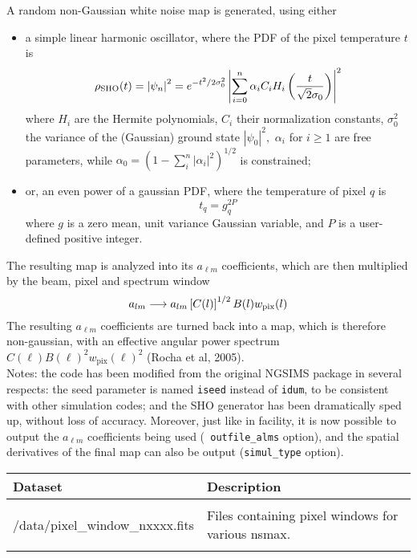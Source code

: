 \begin{codedescription}
{%
A random non-Gaussian white noise map is generated, using either
\begin{itemize}
%
\item a simple linear harmonic oscillator, where the PDF of the pixel
temperature $t$ is
	\begin{equation}
	\rho_{\rm SHO}(t) = \left| \psi_n\right|^2 = e^{-t^2/2\sigma_0^2} \left|\sum_{i=0}^{n} \alpha_i
C_i H_i \left(\frac{t}{\sqrt{2}\sigma_0}\right)\right|^2 \label{eq:nongauss_sho}
	\end{equation}
where $H_i$ are the Hermite polynomials, $C_i$ their normalization constants,
$\sigma_0^2$ the variance of the (Gaussian) ground state $\left|\psi_0\right|^2,$
$\alpha_i$ for $i\ge 1$ are free parameters, while $\alpha_0 =
\left(1 - \sum_i^n |\alpha_i|^2\right)^{1/2}$ is constrained;
%
\item or, an even power of a gaussian PDF, where the temperature of pixel $q$ is
	\begin{equation}
	t_q = g_q^{2 P} \label{eq:nongauss_powgauss}
	\end{equation}
where $g$ is a zero mean, unit variance Gaussian variable, and $P$ is
a user-defined positive integer.
\end{itemize}
The resulting map is analyzed into its $a_{\ell m}$ coefficients, which are then
multiplied by the beam, pixel and spectrum window
\begin{equation}
	a_{\ell m} \longrightarrow a_{\ell m} \left[C(l)\right]^{1/2} B(\ell) w_{\rm pix}(\ell) \nonumber
\end{equation}
The resulting $a_{\ell m}$ coefficients are turned back into a map, which is
therefore non-gaussian, with an effective angular power spectrum $C(\ell) B(\ell)^2
w_\mathrm{pix}(\ell)^2$ (Rocha et al, 2005).
\\
Notes: the code has been modified from the original NGSIMS package in several
respects:
the seed parameter is named {\tt iseed} instead of {\tt idum}, to be consistent
with other \healpix simulation codes; and the SHO generator has been
dramatically sped up, without loss of accuracy. Moreover, just like in  facility,
it is now possible to output the $a_{\ell m}$ coefficients being used ({\tt
outfile\_alms} option), and the spatial derivatives of the final map can also be
output ({\tt simul\_type} option).
}
\end{codedescription}


\begin{datasets}
{
\begin{tabular}{p{0.3\hsize} p{0.35\hsize}} \hline  
  \textbf{Dataset} & \textbf{Description} \\ \hline
                   &                      \\ %
  /data/pixel\_window\_nxxxx.fits & Files containing pixel windows for
                   various nsmax.\\ 
                   &                      \\ \hline %
\end{tabular}
} 
\end{datasets}

